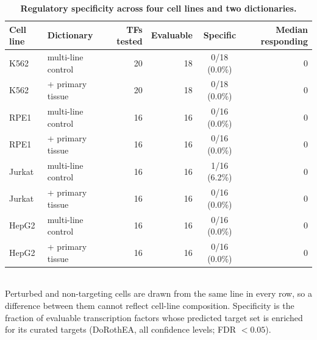 \begin{table}[htbp]
\centering
\caption{\textbf{Regulatory specificity across four cell lines and two dictionaries.}}
\label{tab:crossline}
\smallskip
\small
\begin{tabular}{llrrcr}
\toprule
Cell line & Dictionary & TFs tested & Evaluable & Specific & Median responding \\
\midrule
K562 & multi-line control & 20 & 18 & 0/18 (0.0\%) & 0 \\
K562 & + primary tissue & 20 & 18 & 0/18 (0.0\%) & 0 \\
RPE1 & multi-line control & 16 & 16 & 0/16 (0.0\%) & 0 \\
RPE1 & + primary tissue & 16 & 16 & 0/16 (0.0\%) & 0 \\
Jurkat & multi-line control & 16 & 16 & 1/16 (6.2\%) & 0 \\
Jurkat & + primary tissue & 16 & 16 & 0/16 (0.0\%) & 0 \\
HepG2 & multi-line control & 16 & 16 & 0/16 (0.0\%) & 0 \\
HepG2 & + primary tissue & 16 & 16 & 0/16 (0.0\%) & 0 \\
\bottomrule
\end{tabular}
\\[2pt]
\footnotesize Perturbed and non-targeting cells are drawn from the same line in every row, so a difference between them cannot reflect cell-line composition. Specificity is the fraction of evaluable transcription factors whose predicted target set is enriched for its curated targets (DoRothEA, all confidence levels; FDR $< 0.05$).
\end{table}
